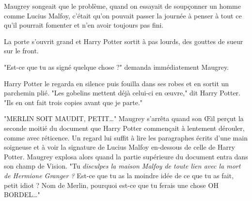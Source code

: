 Maugrey songeait que le problème, quand on essayait de soupçonner un homme comme Lucius Malfoy, c'était qu'on pouvait passer la journée à penser à tout ce qu'il pourrait fomenter et n'en avoir toujours pas fini.

La porte s'ouvrit grand et Harry Potter sortit à pas lourds, des gouttes de sueur sur le front.

"Est-ce que tu as signé quelque chose ?" demanda immédiatement Maugrey.

Harry Potter le regarda en silence puis fouilla dans ses robes et en sortit un parchemin plié. "Les gobelins mettent déjà celui-ci en œuvre," dit Harry Potter. "Ils en ont fait trois copies avant que je parte."

"MERLIN SOIT MAUDIT, PETIT…" Maugrey s'arrêta quand son Œil perçut la seconde moitié du document que Harry Potter commençait à lentement dérouler, comme avec réticence. Un regard lui suffit à lire les paragraphes écrits d'une main soigneuse et à voir la signature de Lucius Malfoy en-dessous de celle de Harry Potter. Maugrey explosa alors quand la partie supérieure du document entra dans son champ de Vision. "Tu \emph{disculpes la maison Malfoy de toute lien avec la mort de Hermione Granger ?}  Est-ce que tu as la moindre idée de ce que tu as fait, petit idiot ? Nom de Merlin, pourquoi est-ce que tu ferais une chose OH BORDEL…"

